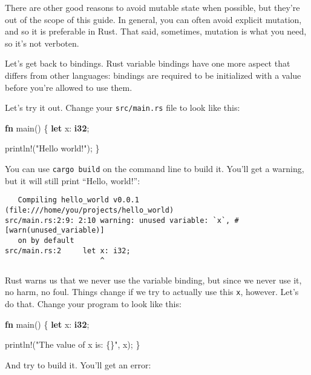 \documentclass[a4paper,]{book}
\newenvironment{Shaded}{\begin{snugshade}}{\end{snugshade}}
\newcommand{\KeywordTok}[1]{\textcolor[rgb]{0.13,0.29,0.53}{\textbf{{#1}}}}
\newcommand{\StringTok}[1]{\textcolor[rgb]{0.31,0.60,0.02}{{#1}}}
\newcommand{\OtherTok}[1]{\textcolor[rgb]{0.56,0.35,0.01}{{#1}}}
\newcommand{\NormalTok}[1]{{#1}}
\begin{document}
There are other good reasons to avoid mutable state when possible, but
they're out of the scope of this guide. In general, you can often avoid
explicit mutation, and so it is preferable in Rust. That said,
sometimes, mutation is what you need, so it's not verboten.

Let's get back to bindings. Rust variable bindings have one more aspect
that differs from other languages: bindings are required to be
initialized with a value before you're allowed to use them.

Let's try it out. Change your \texttt{src/main.rs} file to look like
this:

\begin{Shaded}
\begin{Highlighting}[]
\KeywordTok{fn} \NormalTok{main() \{}
    \KeywordTok{let} \NormalTok{x: }\KeywordTok{i32}\NormalTok{;}

    \OtherTok{println!}\NormalTok{(}\StringTok{"Hello world!"}\NormalTok{);}
\NormalTok{\}}
\end{Highlighting}
\end{Shaded}

You can use \texttt{cargo\ build} on the command line to build it.
You'll get a warning, but it will still print ``Hello, world!'':

\begin{verbatim}
   Compiling hello_world v0.0.1 (file:///home/you/projects/hello_world)
src/main.rs:2:9: 2:10 warning: unused variable: `x`, #[warn(unused_variable)]
   on by default
src/main.rs:2     let x: i32;
                      ^
\end{verbatim}

Rust warns us that we never use the variable binding, but since we never
use it, no harm, no foul. Things change if we try to actually use this
\texttt{x}, however. Let's do that. Change your program to look like
this:

\begin{Shaded}
\begin{Highlighting}[]
\KeywordTok{fn} \NormalTok{main() \{}
    \KeywordTok{let} \NormalTok{x: }\KeywordTok{i32}\NormalTok{;}

    \OtherTok{println!}\NormalTok{(}\StringTok{"The value of x is: \{\}"}\NormalTok{, x);}
\NormalTok{\}}
\end{Highlighting}
\end{Shaded}

And try to build it. You'll get an error:
\end{document}
